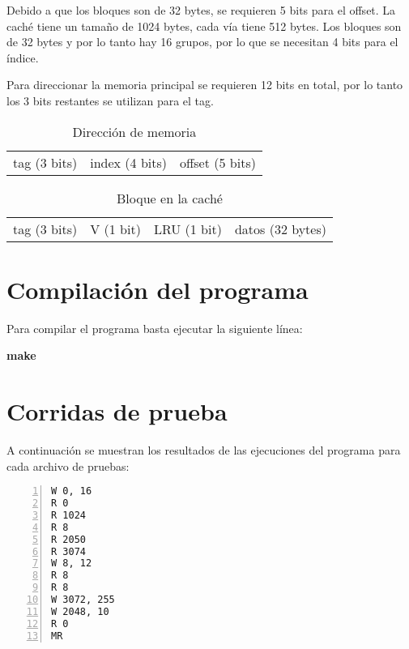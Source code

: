 \documentclass[11pt,a4paper, spanish]{article}
\begin{document}
Debido a que los bloques son de 32 bytes, se requieren 5 bits para el offset. La caché
tiene un tamaño de 1024 bytes, cada vía tiene 512 bytes. Los bloques son de 32 bytes
y por lo tanto hay 16 grupos, por lo que se necesitan 4 bits para el índice.

Para direccionar la memoria principal se requieren 12 bits en total, por lo tanto los
3 bits restantes se utilizan para el tag.

\begin{table}[h!]
  \begin{center}
    \label{tab:table1}
    \begin{tabular}{|c|c|c|}
        \cline{1-3}
        tag (3 bits) & index (4 bits) & offset (5 bits)\\
        \cline{1-3}
    \end{tabular}
    \caption{Dirección de memoria}
  \end{center}
\end{table}

\begin{table}[h!]
  \begin{center}
    \label{tab:table1}
    \begin{tabular}{|c|c|c|c|}
        \cline{1-4}
        tag (3 bits) & V (1 bit) & LRU (1 bit) & datos (32 bytes)\\
        \cline{1-4}
    \end{tabular}
    \caption{Bloque en la caché}
  \end{center}
\end{table}

\section{Compilación del programa}

Para compilar el programa basta ejecutar la siguiente línea:

\begin{center}
\textbf{make}
\end{center}

\section{Corridas de prueba}

A continuación se muestran los resultados de las ejecuciones del programa para cada archivo de pruebas:

\begin{lstlisting}[numbers=left, tabsize=2, basicstyle=\fontsize{11}{13}\ttfamily, frame=single, caption={prueba1.mem}]
W 0, 16
R 0
R 1024
R 8
R 2050
R 3074
W 8, 12
R 8
R 8
W 3072, 255
W 2048, 10
R 0
MR
\end{lstlisting}
\end{document}
